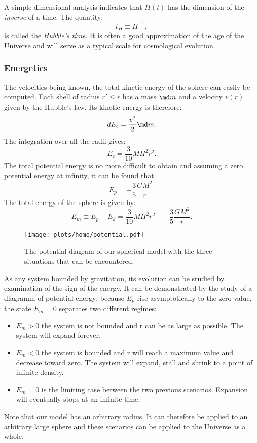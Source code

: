 A simple dimensional analysis indicates that $H(t)$ has the dimension of the \emph{inverse} of a time. The quantity:
\begin{equation}
	t_H \equiv H^{-1},
\end{equation}
is called the \emph{Hubble's time}. It is often a good approximation of the age of the Universe and will serve as a typical scale for cosmological evolution.

\subsubsection{Energetics} %
\label{ssub:energetics}
The velocities being known, the total kinetic energy of the sphere can easily be computed. Each shell of radius $r'\le r$ has a mass $\md m$ and a velocity $v(r)$ given by the Hubble's law. Its kinetic energy is therefore:
\begin{equation}
	dE_c=\frac{v^2}{2}\md m.
\end{equation}
The integration over all the radii gives:
\begin{equation}
	E_c=\frac{3}{10}MH^2r^2.
\end{equation}
The total potential energy is no more difficult to obtain and assuming a zero potential energy at infinity, it can be found that
\begin{equation}
	E_p=-\frac{3}{5}\frac{GM^2}{r}.
\end{equation}
The total energy of the sphere is given by:
\begin{equation}
	E_m\equiv E_p+E_k=\frac{3}{10}MH^2r^2--\frac{3}{5}\frac{GM^2}{r}.
\end{equation}

\begin{figure}[htbp]
	\centering
		\texttt{[image: plots/homo/potential.pdf]}
	\caption{The potential diagram of our spherical model with the three situations that can be encountered.}
	\label{fig:plots_homo_potential}
\end{figure}

As any system bounded by gravitation, its evolution can be studied by examination of the sign of the energy. It can be demonstrated by the study of a diagramm of potential energy: because $E_p$ rise asymptotically to the zero-value, the state $E_m=0$ separates two different regimes:
\begin{itemize}
	\item $E_m>0$ the system is not bounded and r can be as large as possible. The system will expand forever.
	\item $E_m<0$ the system is bounded and r will reach a maximum value and decrease toward zero. The system will expand, stall and shrink to a point of infinite density.
	\item $E_m=0$ is the limiting case between the two previous scenarios. Expansion will eventually stops at an infinite time. 
\end{itemize}
Note that our model has an arbitrary radius. It can therefore be applied to an arbitrary large sphere and these scenarios can be applied to the Universe as a whole.

